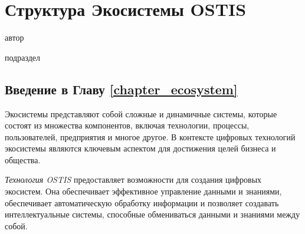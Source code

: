 \chapter{Структура Экосистемы OSTIS}
{\label{chapter_ecosystem}}

\vspace{-7\baselineskip}

\begin{SCn}
\begin{scnrelfromlist}{автор}
\end{scnrelfromlist}

\bigskip


\bigskip

\begin{scnrelfromlist}{подраздел}
\end{scnrelfromlist}

\end{SCn}

\section*{Введение в Главу \ref{chapter_ecosystem}}
Экосистемы представляют собой сложные и динамичные системы, которые состоят из множества компонентов, включая технологии, процессы, пользователей, предприятия и многое другое. В контексте цифровых технологий экосистемы являются ключевым аспектом для достижения целей бизнеса и общества.

\textit{Технология OSTIS} предоставляет возможности для создания цифровых экосистем. Она обеспечивает эффективное управление данными и знаниями, обеспечивает автоматическую обработку информации и позволяет создавать интеллектуальные системы, способные обмениваться данными и знаниями между собой.

